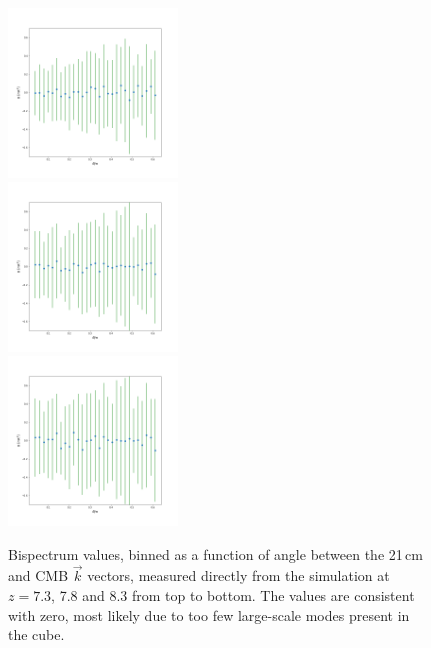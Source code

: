 \begin{figure}
\centering
\includegraphics[width=0.4\textwidth]{chapters/ksz_21cm/figures/analytic_bispec_decimate0.png}\\
\includegraphics[width=0.4\textwidth]{chapters/ksz_21cm/figures/analytic_bispec_decimate2.png}\\
\includegraphics[width=0.4\textwidth]{chapters/ksz_21cm/figures/analytic_bispec_decimate4.png}
\caption[Bispectrum values, binned as a function of angle between the 21\,cm and CMB $\vec{k}$ vectors, measured directly from the simulation.]{Bispectrum values, binned as a function of angle between the 21\,cm and CMB $\vec{k}$ vectors, measured directly from the simulation at $z=7.3$, 7.8 and 8.3 from top to bottom. The values are consistent with zero, most likely due to too few large-scale modes present in the cube.}
\label{fig:ksz_21cm_direct_bispectrum}
\end{figure}

